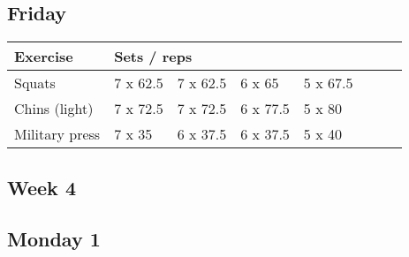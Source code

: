 \documentclass[12pt, a4paper]{article}%
\begin{document}
  \subsection*{\hspace{0.5em} Friday }


  \begin{tabular}{l|lllllll}
  \hspace{0.75em} \textbf{Exercise} & \multicolumn{ 7 }{l}{ \textbf{Sets / reps} } \\ \hline

            \hspace{0.75em} Squats
            & 7 x 62.5
            & 7 x 62.5
            & 6 x 65
            & 5 x 67.5
            & 
            & 
            & 
            \\


            \hspace{0.75em} Chins (light)
            & 7 x 72.5
            & 7 x 72.5
            & 6 x 77.5
            & 5 x 80
            & 
            & 
            & 
            \\


            \hspace{0.75em} Military press
            & 7 x 35
            & 6 x 37.5
            & 6 x 37.5
            & 5 x 40
            & 
            & 
            & 
            \\


  \end{tabular}


\clearpage \subsection*{\hspace{0.25em} Week 4 }
  \subsection*{\hspace{0.5em} Monday 1 }
\end{document}
